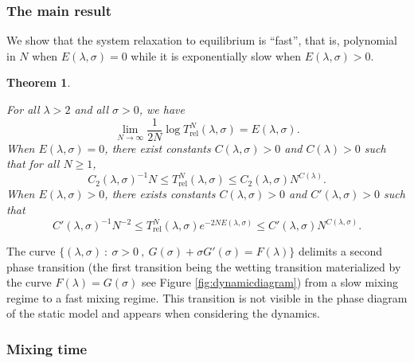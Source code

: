 \documentclass[reqno,11pt]{amsart}
\numberwithin{equation}{section}
\newcommand{\gl}{\lambda}
\newcommand{\gs}{\sigma}
\newtheorem{theorem}{Theorem}[section]
\newcommand{\Rel}{\mathrm{rel}}
\begin{document}
\subsubsection*{The main result}
We show that the system relaxation to equilibrium is ``fast'', that is, polynomial in $N$ when $E(\gl,\sigma)=0$ while it is exponentially slow when $E(\gl,\sigma)>0$.

 \begin{theorem} \label{th:relax}
 
 
 
For all $\lambda>2$ and all $\sigma>0$, we have
\begin{equation}
\lim_{N \to \infty}\frac{1}{2N} \log T_{\Rel}^N(\lambda, \sigma)= E(\gl,\sigma).
\end{equation}
When $E(\gl,\sigma)=0$, there exist constants $C(\lambda, \sigma)>0$ and $C(\lambda)>0$ such that for all $N\geq 1$,
\begin{equation}\label{nobottlecase}
C_2(\lambda, \sigma)^{-1} N\leq T_{\Rel}^N(\lambda, \sigma)\leq C_2(\lambda, \sigma)  N^{C(\lambda)}. 
\end{equation}
When $E(\gl, \gs)>0$, there exists constants $C(\lambda, \sigma)>0$ and $C'(\lambda, \sigma)>0$ such that
 $$C'(\gl, \gs)^{-1} N^{-2} \le T_{\Rel}^N(\lambda, \sigma) e^{-2N E(\gl,\sigma)}\le C'(\gl, \gs) N^{C(\gl,\gs)}.$$  
\end{theorem}


The curve $\{ (\gl,\sigma) \ : \ \sigma>0 \ , \ G(\sigma)+\sigma G'(\sigma)=F(\gl)\}$  delimits a second phase transition (the first transition being the wetting transition materialized by the curve $F(\gl)=G(\gs)$ see Figure \ref{fig:dynamicdiagram}) from a slow mixing regime to a fast mixing regime. This transition is not visible in the phase diagram of the static model and appears when considering the dynamics.



\subsubsection*{Mixing time}
\end{document}
